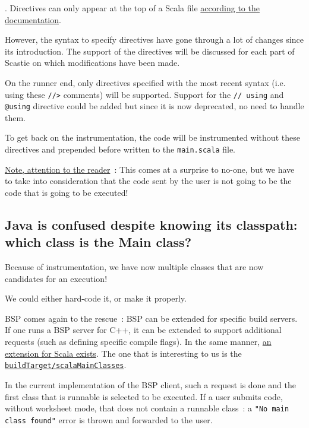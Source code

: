 \documentclass{article}
\begin{document}
. Directives can only appear at the top of a Scala file \href{https://scala-cli.virtuslab.org/docs/guides/using-directives#semantics}{according to the documentation}. 

However, the syntax to specify directives have gone through a lot of changes since its introduction. The support of the directives will be discussed for each part of Scastie on which modifications have been made.

On the runner end, only directives specified with the most recent syntax (i.e. using these \lstinline{//>} comments) will be supported. Support for the \lstinline{// using} and \lstinline{@using} directive could be added but since it is now deprecated, no need to handle them.

To get back on the instrumentation, the code will be instrumented without these directives and prepended before written to the \lstinline{main.scala} file.

\underline{Note, attention to the reader}~: This comes at a surprise to no-one, but we have to take into consideration that the code sent by the user is not going to be the code that is going to be executed! 

\subsection{Java is confused despite knowing its classpath: which class is the Main class?}

Because of instrumentation, we have now multiple classes that are now candidates for an execution!

We could either hard-code it, or make it properly.

BSP comes again to the rescue~: BSP can be extended for specific build servers. If one runs a BSP server for C++, it can be extended to support additional requests (such as defining specific compile flags). In the same manner, \href{https://build-server-protocol.github.io/docs/extensions/scala}{an extension for Scala exists}. The one that is interesting to us is the \href{https://build-server-protocol.github.io/docs/extensions/scala#scala-main-classes-request}{\lstinline{buildTarget/scalaMainClasses}}.

In the current implementation of the BSP client, such a request is done and the first class that is runnable is selected to be executed. If a user submits code, without worksheet mode, that does not contain a runnable class~: a \lstinline{"No main class found"} error is thrown and forwarded to the user.
\end{document}
